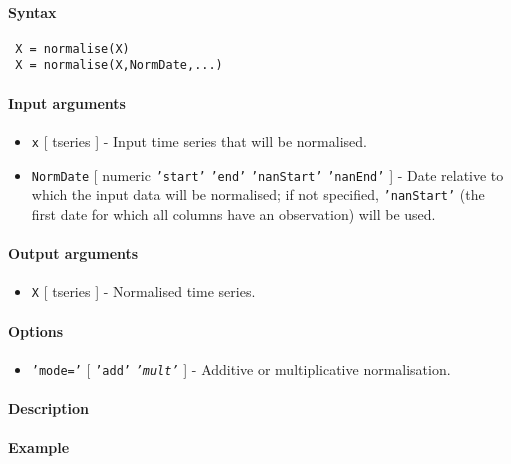 


	\paragraph{Syntax}
 
 \begin{verbatim}
 X = normalise(X)
 X = normalise(X,NormDate,...)
 \end{verbatim}
 
 \paragraph{Input arguments}
 
 \begin{itemize}
 \item
   \texttt{x} {[} tseries {]} - Input time series that will be
   normalised.
 \item
   \texttt{NormDate} {[} numeric \textbar{} \texttt{'start'} \textbar{}
   \texttt{'end'} \textbar{} \texttt{'nanStart'} \textbar{}
   \texttt{'nanEnd'} {]} - Date relative to which the input data will be
   normalised; if not specified, \texttt{'nanStart'} (the first date for
   which all columns have an observation) will be used.
 \end{itemize}
 
 \paragraph{Output arguments}
 
 \begin{itemize}
 \item
   \texttt{X} {[} tseries {]} - Normalised time series.
 \end{itemize}
 
 \paragraph{Options}
 
 \begin{itemize}
 \item
   \texttt{'mode='} {[} \texttt{'add'} \textbar{} \emph{\texttt{'mult'}}
   {]} - Additive or multiplicative normalisation.
 \end{itemize}
 
 \paragraph{Description}
 
 \paragraph{Example}


